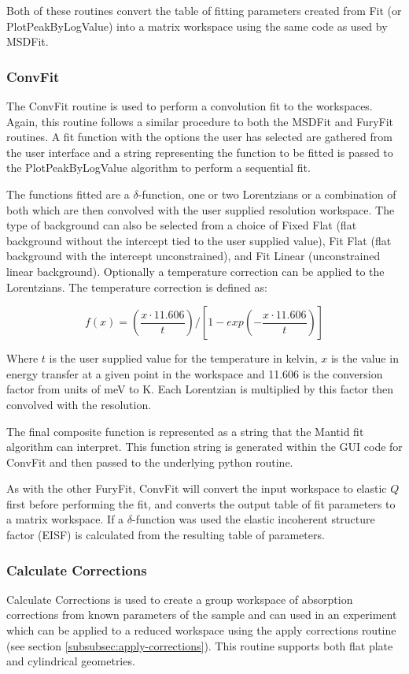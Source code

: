 \documentclass[paper=a4, fontsize=11pt]{scrartcl}	%
\numberwithin{equation}{section}															%
\numberwithin{figure}{section}																%
\numberwithin{table}{section}																%
\begin{document}
Both of these routines convert the table of fitting parameters created from Fit (or PlotPeakByLogValue) into a matrix workspace using the same code as used by MSDFit.

\subsubsection{ConvFit}
\label{subsubsec:convfit}
The ConvFit routine is used to perform a convolution fit to the workspaces. Again, this routine follows a similar procedure to both the MSDFit and FuryFit routines. A fit function with the options the user has selected are gathered from the user interface and a string representing the function to be fitted is passed to the PlotPeakByLogValue algorithm to perform a sequential fit.

The functions fitted are a $\delta$-function, one or two Lorentzians or a combination of both which are then convolved with the user supplied resolution workspace. The type of background can also be selected from a choice of Fixed Flat (flat background without the intercept tied to the user supplied value), Fit Flat (flat background with the intercept unconstrained), and Fit Linear (unconstrained linear background). Optionally a temperature correction can be applied to the Lorentzians. The temperature correction is defined as:

\begin{equation}
f(x) = (\frac{x \cdot 11.606}{t}) / [1 - exp(-\frac{x \cdot 11.606}{t})]
\end{equation}

Where $t$ is the user supplied value for the temperature in kelvin, $x$ is the value in energy transfer at a given point in the workspace and 11.606 is the conversion factor from units of meV to K. Each Lorentzian is multiplied by this factor then convolved with the resolution.

The final composite function is represented as a string that the Mantid fit algorithm can interpret. This function string is generated within the GUI code for ConvFit and then passed to the underlying python routine.

As with the other FuryFit, ConvFit will convert the input workspace to elastic $Q$ first before performing the fit, and converts the output table of fit parameters to a matrix workspace. If a $\delta$-function was used the elastic incoherent structure factor (EISF) is calculated from the resulting table of parameters.

\subsubsection{Calculate Corrections}
Calculate Corrections is used to create a group workspace of absorption corrections from known parameters of the sample and can used in an experiment which can be applied to a reduced workspace using the apply corrections routine (see section \ref{subsubsec:apply-corrections}). This routine supports both flat plate and cylindrical geometries.
\end{document}
